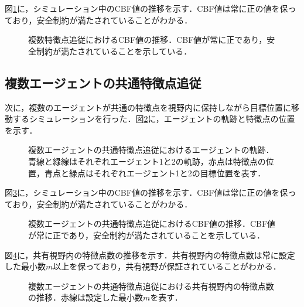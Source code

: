 図\ref{fig:multi_feature_cbf_value}に，シミュレーション中のCBF値の推移を示す．CBF値は常に正の値を保っており，安全制約が満たされていることがわかる．

\begin{figure}[htbp]
    \centering
    \caption{複数特徴点追従におけるCBF値の推移．CBF値が常に正であり，安全制約が満たされていることを示している．}
    \label{fig:multi_feature_cbf_value}
\end{figure}

\subsection{複数エージェントの共通特徴点追従}

次に，複数のエージェントが共通の特徴点を視野内に保持しながら目標位置に移動するシミュレーションを行った．図\ref{fig:multi_agent_trajectory}に，エージェントの軌跡と特徴点の位置を示す．

\begin{figure}[htbp]
    \centering
    \caption{複数エージェントの共通特徴点追従におけるエージェントの軌跡．青線と緑線はそれぞれエージェント1と2の軌跡，赤点は特徴点の位置，青点と緑点はそれぞれエージェント1と2の目標位置を表す．}
    \label{fig:multi_agent_trajectory}
\end{figure}

図\ref{fig:multi_agent_cbf_value}に，シミュレーション中のCBF値の推移を示す．CBF値は常に正の値を保っており，安全制約が満たされていることがわかる．

\begin{figure}[htbp]
    \centering
    \caption{複数エージェントの共通特徴点追従におけるCBF値の推移．CBF値が常に正であり，安全制約が満たされていることを示している．}
    \label{fig:multi_agent_cbf_value}
\end{figure}

図\ref{fig:multi_agent_shared_features}に，共有視野内の特徴点数の推移を示す．共有視野内の特徴点数は常に設定した最小数$m$以上を保っており，共有視野が保証されていることがわかる．

\begin{figure}[htbp]
    \centering
    \caption{複数エージェントの共通特徴点追従における共有視野内の特徴点数の推移．赤線は設定した最小数$m$を表す．}
    \label{fig:multi_agent_shared_features}
\end{figure}


